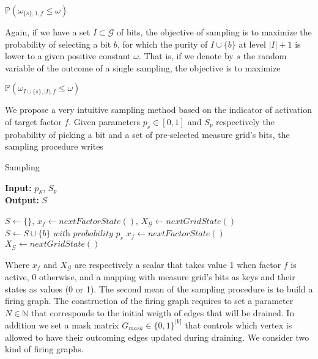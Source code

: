 \documentclass[a4paper, 11pt]{article}
\begin{document}
\begin{center}
$\mathbb{P}( \omega_{\{s\}, 1, f} \leq \omega)$
\end{center}  

Again, if we have a set $I \subset \mathcal{G}$ of bits, the objective of sampling is to maximize the probability of selecting a bit $b$, for which the purity of $I \cup \{b \}$ at level $\vert I \vert + 1$ is lower to a given positive constant $\omega$. That is, if we denote by $s$ the random variable of the outcome of a single sampling, the objective is to maximize

\begin{center}
$\mathbb{P}( \omega_{I \cup \{ s\}, \vert I \vert, f} \leq \omega)$
\end{center} 

We propose a very intuitive sampling method based on the indicator of activation of target factor $f$. Given parameters $p_s \in [0, 1]$ and $S_p$ respectively the probability of picking a bit and a set of pre-selected measure grid's bits, the sampling procedure writes

\begin{algorithm}[H]
\caption{Sampling}
\textbf{Input:} $p_{\mathcal{S}}$, $S_{p}$\\
\textbf{Output:} $S$
\begin{algorithmic}
\State $S \gets \{ \}$, $x_f \gets nextFactorState()$, $X_{\mathcal{G}} \gets nextGridState()$
    \State $S \gets S \cup \{ b \} \textit{ with probability } p_s$
   \EndIf	
  \EndFor	
 \EndIf
 \State $x_f \gets nextFactorState()$
 \State $X_{\mathcal{G}} \gets nextGridState()$
\EndWhile
\end{algorithmic}
\end{algorithm}

Where $x_f$ and $X_{\mathcal{G}}$ are respectively a scalar that takes value 1 when factor $f$ is active, 0 otherwise, and a mapping with measure grid's bits as keys and their states as values (0 or 1). The second mean of the sampling procedure is to build a firing graph. The construction of the firing graph requires to set a parameter $N \in \mathbb{N}$ that corresponds to the initial weigth of edges that will be drained. In addition we set a mask matrix $G_{mask} \in \{0, 1\}^{\vert V \vert}$ that controls which vertex is allowed to have their outcoming edges updated during draining. We consider two kind of firing graphs.
\end{document}
